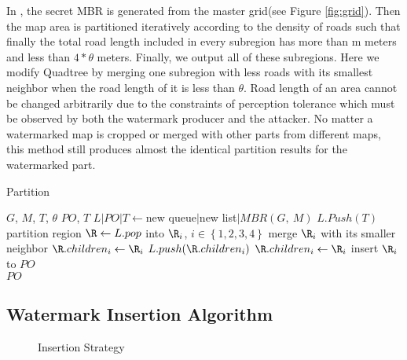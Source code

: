 In , the secret MBR is generated from the master grid(see Figure \ref{fig:grid}). 
Then the map area is partitioned iteratively according to the density of roads 
such that finally the total road length included in every subregion has more 
than m meters and less than $4 * \theta$ meters. Finally, we output all of 
these subregions. Here we modify Quadtree by merging one subregion with less roads 
with its smallest neighbor when the road length of it is less than $\theta$.
Road length of an area cannot be changed arbitrarily
due to the constraints of perception tolerance which must be observed by both
the watermark producer and the attacker. No matter a watermarked map is cropped 
or merged with other parts from different maps, this method still produces 
almost the identical partition results for the watermarked part. 



\begin{algorithm}[th]
\caption{Partition}
\label{Partition}
\begin{algorithmic}[1]
\Require $G$, $M$, $T$, $\theta$
\Ensure $PO$, $T$
\State $L|PO|T\leftarrow$new queue$|$new list$|MBR(G,~M)$
\State $L.Push(T)$
\State partition region $\R \leftarrow L.pop$ into ${\R}_{i}$, $i\in \left\{1,2,3,4\right\}$
\State merge ${\R}_{i}$ with its smaller neighbor
\State $\R.children_i \leftarrow {\R}_{i}$ 
\State  $L.push(\R.children_i)$
\Else{}
\State $\R.children_i \leftarrow {\R}_{i}$
\State insert ${\R}_{i}$ to $PO$
\EndIf
\EndFor
\EndWhile\\
\Return $PO$
\EndFunction
\end{algorithmic}
\end{algorithm}

\subsection{Watermark Insertion Algorithm}
\label{sec:insert}
\begin{figure}[bh]
\centering
{}
\caption{Insertion Strategy %
}
\label{fig:insert}
\end{figure} 

